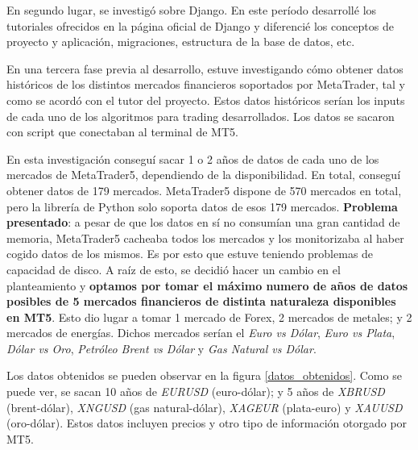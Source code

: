 En segundo lugar, se investigó sobre Django. En este período desarrollé los tutoriales ofrecidos en la página oficial de Django y diferencié los conceptos de proyecto y aplicación, migraciones, estructura de la base de datos, etc. \newline

En una tercera fase previa al desarrollo, estuve investigando cómo obtener datos históricos de los distintos mercados financieros soportados por MetaTrader, tal y como se acordó con el tutor del proyecto. Estos datos históricos serían los inputs de cada uno de los algoritmos para trading desarrollados. Los datos se sacaron con script que conectaban al terminal de MT5.\newline

En esta investigación conseguí sacar 1 o 2 años de datos de cada uno de los mercados de MetaTrader5, dependiendo de la disponibilidad. En total, conseguí obtener datos de 179 mercados. MetaTrader5 dispone de 570 mercados en total, pero la librería de Python solo soporta datos de esos 179 mercados. \textbf{Problema presentado}: a pesar de que los datos en sí no consumían una gran cantidad de memoria, MetaTrader5 cacheaba todos los mercados y los monitorizaba al haber cogido datos de los mismos. Es por esto que estuve teniendo problemas de capacidad de disco. A raíz de esto, se decidió hacer un cambio en el planteamiento y \textbf{optamos por tomar el máximo numero de años de datos posibles de 5 mercados financieros de distinta naturaleza disponibles en MT5}. Esto dio lugar a tomar 1 mercado de Forex, 2 mercados de metales; y 2 mercados de energías. Dichos mercados serían el \textit{Euro vs Dólar}, \textit{Euro vs Plata}, \textit{Dólar vs Oro}, \textit{Petróleo Brent vs Dólar} y \textit{Gas Natural vs Dólar}. \newline

Los datos obtenidos se pueden observar en la figura \ref{datos_obtenidos}. Como se puede ver, se sacan 10 años de \textit{EURUSD} (euro-dólar); y 5 años de \textit{XBRUSD} (brent-dólar), \textit{XNGUSD} (gas natural-dólar), \textit{XAGEUR} (plata-euro) y \textit{XAUUSD} (oro-dólar). Estos datos incluyen precios y otro tipo de información otorgado por MT5. \newline

